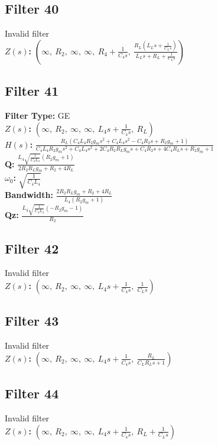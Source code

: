\documentclass{article}
\begin{document}
\subsection*{Filter 40}
Invalid filter \\ 
\textbf{$Z(s)$:} $\left( \infty, \  R_{2}, \  \infty, \  \infty, \  R_{4} + \frac{1}{C_{4} s}, \  \frac{R_{L} \left(L_{L} s + \frac{1}{C_{L} s}\right)}{L_{L} s + R_{L} + \frac{1}{C_{L} s}}\right)$ \\ 
\subsection*{Filter 41}
\textbf{Filter Type:} GE \\ 
\textbf{$Z(s)$:} $\left( \infty, \  R_{2}, \  \infty, \  \infty, \  L_{4} s + \frac{1}{C_{4} s}, \  R_{L}\right)$ \\ 
\textbf{$H(s)$:} $\frac{R_{L} \left(C_{4} L_{4} R_{2} g_{m} s^{2} + C_{4} L_{4} s^{2} - C_{4} R_{2} s + R_{2} g_{m} + 1\right)}{C_{4} L_{4} R_{2} g_{m} s^{2} + C_{4} L_{4} s^{2} + 2 C_{4} R_{2} R_{L} g_{m} s + C_{4} R_{2} s + 4 C_{4} R_{L} s + R_{2} g_{m} + 1}$ \\ 
\textbf{Q:} $\frac{L_{4} \sqrt{\frac{1}{C_{4} L_{4}}} \left(R_{2} g_{m} + 1\right)}{2 R_{2} R_{L} g_{m} + R_{2} + 4 R_{L}}$ \\ 
\textbf{$\omega_0$:} $\sqrt{\frac{1}{C_{4} L_{4}}}$ \\ 
\textbf{Bandwidth:} $\frac{2 R_{2} R_{L} g_{m} + R_{2} + 4 R_{L}}{L_{4} \left(R_{2} g_{m} + 1\right)}$ \\ 
\textbf{Qz:} $\frac{L_{4} \sqrt{\frac{1}{C_{4} L_{4}}} \left(- R_{2} g_{m} - 1\right)}{R_{2}}$ \\ 
\subsection*{Filter 42}
Invalid filter \\ 
\textbf{$Z(s)$:} $\left( \infty, \  R_{2}, \  \infty, \  \infty, \  L_{4} s + \frac{1}{C_{4} s}, \  \frac{1}{C_{L} s}\right)$ \\ 
\subsection*{Filter 43}
Invalid filter \\ 
\textbf{$Z(s)$:} $\left( \infty, \  R_{2}, \  \infty, \  \infty, \  L_{4} s + \frac{1}{C_{4} s}, \  \frac{R_{L}}{C_{L} R_{L} s + 1}\right)$ \\ 
\subsection*{Filter 44}
Invalid filter \\ 
\textbf{$Z(s)$:} $\left( \infty, \  R_{2}, \  \infty, \  \infty, \  L_{4} s + \frac{1}{C_{4} s}, \  R_{L} + \frac{1}{C_{L} s}\right)$ \\ 
\end{document}
